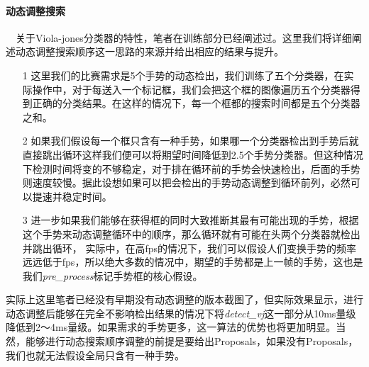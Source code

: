 \documentclass{article}
\begin{document}
\paragraph{{\large 动态调整搜索}}　关于Viola-jones分类器的特性，笔者在训练部分已经阐述过。这里我们将详细阐述动态调整搜索顺序这一思路的来源并给出相应的结果与提升。
\begin{itemize}[leftmargin=*]
\item[1]这里我们的比赛需求是5个手势的动态检出，我们训练了五个分类器，在实际操作中，对于每送入一个标记框，我们会把这个框的图像遍历五个分类器得到正确的分类结果。在这样的情况下，每一个框都的搜索时间都是五个分类器之和。
\item[2] 如果我们{\color{red}假设每一个框只含有一种手势，如果哪一个分类器检出到手势后就直接跳出循环}这样我们便可以将期望时间降低到2.5个手势分类器。但这种情况下检测时间将变的不够稳定，对于排在循环前的手势会快速检出，后面的手势则速度较慢。据此设想如果可以把会检出的手势动态调整到循环前列，必然可以提速并稳定时间。
\item[3]进一步如果我们能够在获得框的同时大致推断其最有可能出现的手势，根据这个手势来动态调整循环中的顺序，那么循环就有可能在头两个分类器就检出并跳出循环， 实际中，在高fps的情况下，我们可以假设人们变换手势的频率远远低于fps，{\color{red}所以绝大多数的情况中，期望的手势都是上一帧的手势，这也是我们\emph{pre\_process}标记手势框的核心假设}。
\end{itemize}
实际上这里笔者已经没有早期没有动态调整的版本截图了，但实际效果显示，进行动态调整后能够在完全不影响检出结果的情况下将\emph{detect\_vj}这一部分从10ms量级降低到2～4ms量级。如果需求的手势更多，这一算法的优势也将更加明显。当然，能够进行动态搜索顺序调整的前提是要给出Proposals，如果没有Proposals，我们也就无法假设全局只含有一种手势。
\end{document}
